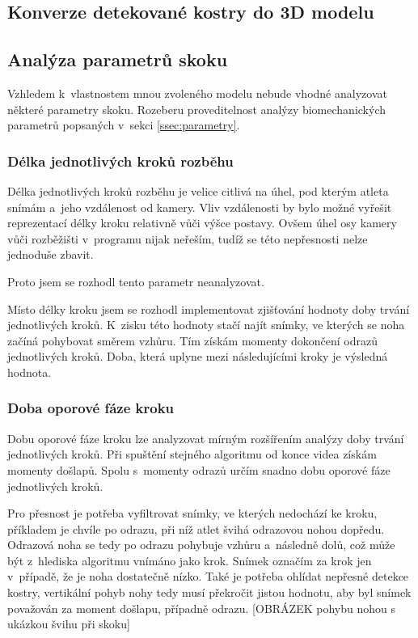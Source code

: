 \subsection{Konverze detekované kostry do 3D modelu}
\label{ssec:konverze}



\subsection{Analýza parametrů skoku}
\label{ssec:analyza}

Vzhledem k~vlastnostem mnou zvoleného modelu nebude vhodné analyzovat některé parametry skoku. Rozeberu proveditelnost analýzy biomechanických parametrů popsaných v~sekci \ref{ssec:parametry}.

\subsubsection{Délka jednotlivých kroků rozběhu}
\label{sssec:delkakroku}

Délka jednotlivých kroků rozběhu je velice citlivá na úhel, pod kterým atleta snímám a~jeho vzdálenost od kamery. Vliv vzdálenosti by bylo možné vyřešit reprezentací délky kroku relativně vůči výšce postavy. Ovšem úhel osy kamery vůči rozběžišti v~programu nijak neřeším, tudíž se této nepřesnosti nelze jednoduše zbavit.

Proto jsem se rozhodl tento parametr neanalyzovat.

Místo délky kroku jsem se rozhodl implementovat zjišťování hodnoty doby trvání jednotlivých kroků. K~zisku této hodnoty stačí najít snímky, ve kterých se noha začíná pohybovat směrem vzhůru. Tím získám momenty dokončení odrazů jednotlivých kroků. Doba, která uplyne mezi následujícími kroky je výsledná hodnota.

\subsubsection{Doba oporové fáze kroku}

Dobu oporové fáze kroku lze analyzovat mírným rozšířením analýzy doby trvání jednotlivých kroků. Při spuštění stejného algoritmu od konce videa získám momenty došlapů. Spolu s~momenty odrazů určím snadno dobu oporové fáze jednotlivých kroků.

Pro přesnost je potřeba vyfiltrovat snímky, ve kterých nedochází ke kroku, příkladem je chvíle po odrazu, při níž atlet švihá odrazovou nohou dopředu. Odrazová noha se tedy po odrazu pohybuje vzhůru a~následně dolů, což může být z~hlediska algoritmu vnímáno jako krok. Snímek označím za krok jen v~případě, že je noha dostatečně nízko. Také je potřeba ohlídat nepřesné detekce kostry, vertikální pohyb nohy tedy musí překročit jistou hodnotu, aby byl snímek považován za moment došlapu, případně odrazu. [OBRÁZEK pohybu nohou s ukázkou švihu při skoku]

